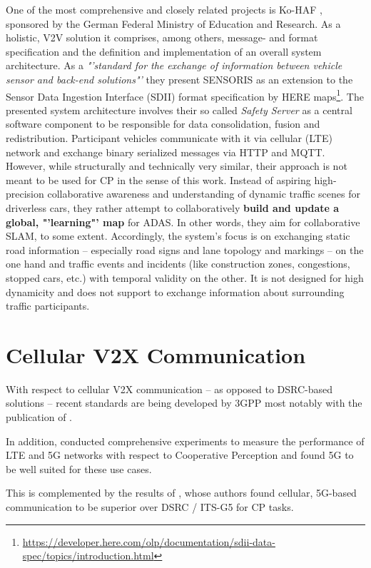 One of the most comprehensive and closely related projects is Ko-HAF \cite{Hohm2019}, sponsored by the German Federal Ministry of Education and Research. As a holistic, V2V solution it comprises, among others, message- and format specification and the definition and implementation of an overall system architecture. As a \textit{"'standard for the exchange of information between vehicle sensor and back-end solutions"'} they present SENSORIS as an extension to the Sensor Data Ingestion Interface (SDII) format specification by HERE maps\footnote{\url{https://developer.here.com/olp/documentation/sdii-data-spec/topics/introduction.html}}. The presented system architecture involves their so called \textit{Safety Server} as a central software component to be responsible for data consolidation, fusion and redistribution. Participant vehicles communicate with it via cellular (LTE) network and exchange binary serialized messages via HTTP and MQTT. However, while structurally and technically very similar, their approach is not meant to be used for CP in the sense of this work. Instead of aspiring high-precision collaborative awareness and understanding of dynamic traffic scenes for driverless cars, they rather attempt to collaboratively \textbf{build and update a global, "'learning"' map} for ADAS. In other words, they aim for collaborative SLAM, to some extent. Accordingly, the system's focus is on exchanging static road information – especially road signs and lane topology and markings – on the one hand and traffic events and incidents (like construction zones, congestions, stopped cars, etc.) with temporal validity on the other. It is not designed for high dynamicity and does not support to exchange information about surrounding traffic participants. 

\section{Cellular V2X Communication}
\label{sec:related_work:cellular_v2x_communication}
With respect to cellular V2X communication – as opposed to DSRC-based solutions – recent standards are being developed by 3GPP most notably with the publication of \cite{3GPP2019}.

In addition, \cite{QualcommTechnologiesInc.2018} conducted comprehensive experiments to measure the performance of LTE and 5G networks with respect to Cooperative Perception and found 5G to be well suited for these use cases. 

This is complemented by the results of \cite{5GAutomotiveAssociation2016}, whose authors found cellular, 5G-based communication to be superior over DSRC / ITS-G5 for CP tasks.

